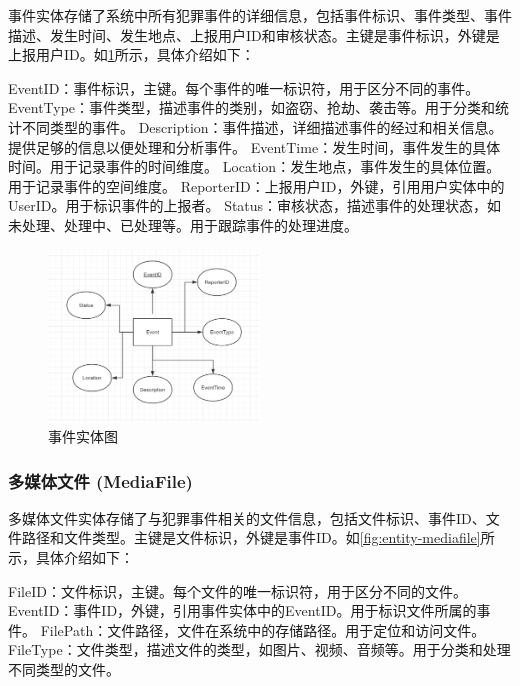 事件实体存储了系统中所有犯罪事件的详细信息，包括事件标识、事件类型、事件描述、发生时间、发生地点、上报用户ID和审核状态。主键是事件标识，外键是上报用户ID。如\cref{fig:entity-event}所示，具体介绍如下：

EventID：事件标识，主键。每个事件的唯一标识符，用于区分不同的事件。
EventType：事件类型，描述事件的类别，如盗窃、抢劫、袭击等。用于分类和统计不同类型的事件。
Description：事件描述，详细描述事件的经过和相关信息。提供足够的信息以便处理和分析事件。
EventTime：发生时间，事件发生的具体时间。用于记录事件的时间维度。
Location：发生地点，事件发生的具体位置。用于记录事件的空间维度。
ReporterID：上报用户ID，外键，引用用户实体中的UserID。用于标识事件的上报者。
Status：审核状态，描述事件的处理状态，如未处理、处理中、已处理等。用于跟踪事件的处理进度。

\begin{figure}[htbp]
    \centering
    \includegraphics[width=0.5\textwidth]{figures/db-img-02.png}
    \caption{事件实体图}
    \label{fig:entity-event}
\end{figure}

\subsubsection{多媒体文件 (MediaFile)}

多媒体文件实体存储了与犯罪事件相关的文件信息，包括文件标识、事件ID、文件路径和文件类型。主键是文件标识，外键是事件ID。如\cref{fig:entity-mediafile}所示，具体介绍如下：

FileID：文件标识，主键。每个文件的唯一标识符，用于区分不同的文件。
EventID：事件ID，外键，引用事件实体中的EventID。用于标识文件所属的事件。
FilePath：文件路径，文件在系统中的存储路径。用于定位和访问文件。
FileType：文件类型，描述文件的类型，如图片、视频、音频等。用于分类和处理不同类型的文件。

